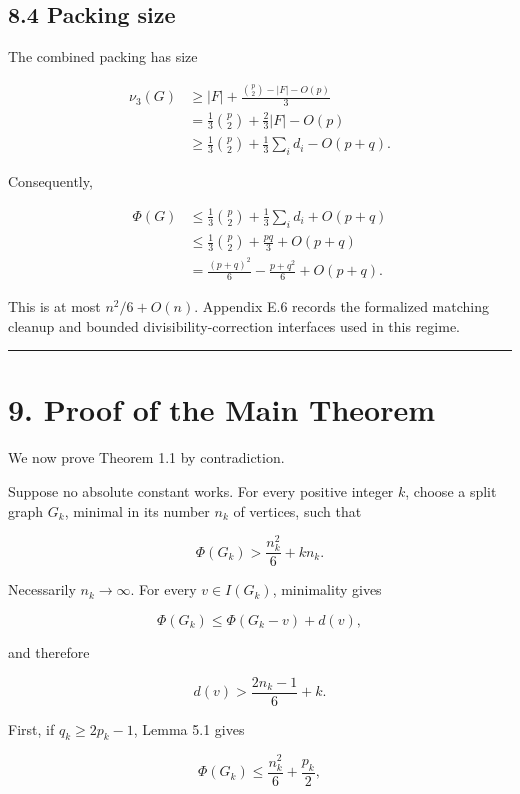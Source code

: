 \documentclass[
  american,
  11pt,
  a4paper,
]{article}
\begin{document}
\subsection{8.4 Packing size}\label{packing-size}

The combined packing has size

\[
\begin{aligned}
\nu_3(G)
&\ge
|F|+\frac{\binom p2-|F|-O(p)}3\\
&=
\frac13\binom p2+\frac23|F|-O(p)\\
&\ge
\frac13\binom p2+\frac13\sum_i d_i-O(p+q).
\end{aligned}
\tag{8.10}
\]

Consequently,

\[
\begin{aligned}
\Phi(G)
&\le
\frac13\binom p2+\frac13\sum_i d_i+O(p+q)\\
&\le
\frac13\binom p2+\frac{pq}{3}+O(p+q)\\
&=
\frac{(p+q)^2}{6}-\frac{p+q^2}{6}+O(p+q).
\end{aligned}
\tag{8.11}
\]

This is at most \(n^2/6+O(n)\). Appendix E.6 records the formalized matching cleanup and bounded divisibility-correction interfaces used in this regime.

\begin{center}\rule{0.5\linewidth}{0.5pt}\end{center}

\section{9. Proof of the Main Theorem}\label{proof-of-the-main-theorem}

We now prove Theorem 1.1 by contradiction.

Suppose no absolute constant works. For every positive integer \(k\), choose a split graph \(G_k\), minimal in its number \(n_k\) of vertices, such that

\[
\Phi(G_k)
>
\frac{n_k^2}{6}+kn_k.
\tag{9.1}
\]

Necessarily \(n_k\to\infty\). For every \(v\in I(G_k)\), minimality gives

\[
\Phi(G_k)
\le
\Phi(G_k-v)+d(v),
\]

and therefore

\[
\boxed{
d(v)>
\frac{2n_k-1}{6}+k.
}
\tag{9.2}
\]

First, if \(q_k\ge2p_k-1\), Lemma 5.1 gives

\[
\Phi(G_k)
\le
\frac{n_k^2}{6}+\frac{p_k}{2},
\]
\end{document}

